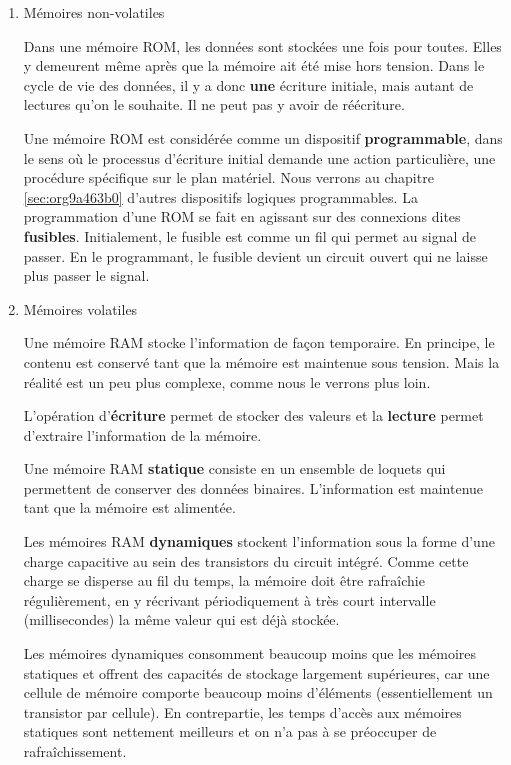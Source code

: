 \documentclass[letter, oneside]{book}
\begin{document}
\begin{enumerate}
\item Mémoires non-volatiles
\label{sec:org83855ab}

Dans une mémoire ROM, les données sont stockées une fois pour
toutes. Elles y demeurent même après que la mémoire ait été mise hors
tension. Dans le cycle de vie des données, il y a donc \textbf{une} écriture
initiale, mais autant de lectures qu'on le souhaite. Il ne peut pas y
avoir de réécriture.

Une mémoire ROM est considérée comme un dispositif \textbf{programmable},
dans le sens où le processus d'écriture initial demande une action
particulière, une procédure spécifique sur le plan matériel. Nous verrons
au chapitre \ref{sec:org9a463b0} d'autres dispositifs logiques
programmables. La programmation d'une ROM se fait en agissant sur des
connexions dites \textbf{fusibles}. Initialement, le fusible est comme un fil
qui permet au signal de passer. En le programmant, le fusible devient
un circuit ouvert qui ne laisse plus passer le signal.

\item Mémoires volatiles
\label{sec:orge173dfc}

Une mémoire RAM stocke l'information de façon temporaire. En principe,
le contenu est conservé tant que la mémoire est maintenue sous
tension. Mais la réalité est un peu plus complexe, comme nous le verrons
plus loin.

L'opération d'\textbf{écriture} permet de stocker des valeurs et la
\textbf{lecture} permet d'extraire l'information de la mémoire.

Une mémoire RAM \textbf{statique} consiste en un ensemble de loquets qui
permettent de conserver des données binaires. L'information est
maintenue tant que la mémoire est alimentée. 

Les mémoires RAM \textbf{dynamiques} stockent l'information sous la forme
d'une charge capacitive au sein des transistors du circuit
intégré. Comme cette charge se disperse au fil du temps, la mémoire
doit être rafraîchie régulièrement, en y récrivant périodiquement à
très court intervalle (millisecondes) la même valeur qui est déjà
stockée.

Les mémoires dynamiques consomment beaucoup moins que les mémoires
statiques et offrent des capacités de stockage largement supérieures,
car une cellule de mémoire comporte beaucoup moins d'éléments
(essentiellement un transistor par cellule). En contrepartie, les
temps d'accès aux mémoires statiques sont nettement meilleurs et on
n'a pas à se préoccuper de rafraîchissement.
\end{enumerate}
\end{document}
